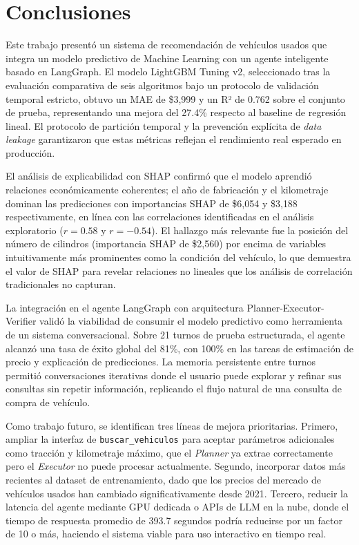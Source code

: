 \documentclass[conference]{IEEEtran}
\begin{document}
\section{Conclusiones}
\label{sec:conclusiones}

Este trabajo presentó un sistema de recomendación de vehículos usados que integra un modelo predictivo de Machine Learning con un agente inteligente basado en LangGraph. El modelo LightGBM Tuning v2, seleccionado tras la evaluación comparativa de seis algoritmos bajo un protocolo de validación temporal estricto, obtuvo un MAE de \$3{,}999 y un R² de 0.762 sobre el conjunto de prueba, representando una mejora del 27.4\% respecto al baseline de regresión lineal. El protocolo de partición temporal y la prevención explícita de \textit{data leakage} garantizaron que estas métricas reflejan el rendimiento real esperado en producción.

El análisis de explicabilidad con SHAP confirmó que el modelo aprendió relaciones económicamente coherentes; el año de fabricación y el kilometraje dominan las predicciones con importancias SHAP de \$6{,}054 y \$3{,}188 respectivamente, en línea con las correlaciones identificadas en el análisis exploratorio ($r{=}0.58$ y $r{=}{-}0.54$). El hallazgo más relevante fue la posición del número de cilindros (importancia SHAP de \$2{,}560) por encima de variables intuitivamente más prominentes como la condición del vehículo, lo que demuestra el valor de SHAP para revelar relaciones no lineales que los análisis de correlación tradicionales no capturan.

La integración en el agente LangGraph con arquitectura Planner-Executor-Verifier validó la viabilidad de consumir el modelo predictivo como herramienta de un sistema conversacional. Sobre 21 turnos de prueba estructurada, el agente alcanzó una tasa de éxito global del 81\%, con 100\% en las tareas de estimación de precio y explicación de predicciones. La memoria persistente entre turnos permitió conversaciones iterativas donde el usuario puede explorar y refinar sus consultas sin repetir información, replicando el flujo natural de una consulta de compra de vehículo.

Como trabajo futuro, se identifican tres líneas de mejora prioritarias. Primero, ampliar la interfaz de \texttt{buscar\_vehiculos} para aceptar parámetros adicionales como tracción y kilometraje máximo, que el \textit{Planner} ya extrae correctamente pero el \textit{Executor} no puede procesar actualmente. Segundo, incorporar datos más recientes al dataset de entrenamiento, dado que los precios del mercado de vehículos usados han cambiado significativamente desde 2021. Tercero, reducir la latencia del agente mediante GPU dedicada o APIs de LLM en la nube, donde el tiempo de respuesta promedio de 393.7 segundos podría reducirse por un factor de 10 o más, haciendo el sistema viable para uso interactivo en tiempo real.
\end{document}
